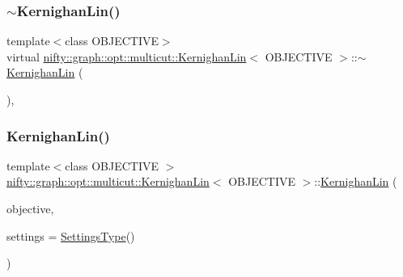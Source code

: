 \subsubsection{\texorpdfstring{$\sim$\+Kernighan\+Lin()}{~KernighanLin()}}
{\footnotesize\ttfamily template$<$class O\+B\+J\+E\+C\+T\+I\+VE$>$ \\
virtual \hyperlink{classnifty_1_1graph_1_1opt_1_1multicut_1_1KernighanLin}{nifty\+::graph\+::opt\+::multicut\+::\+Kernighan\+Lin}$<$ O\+B\+J\+E\+C\+T\+I\+VE $>$\+::$\sim$\hyperlink{classnifty_1_1graph_1_1opt_1_1multicut_1_1KernighanLin}{Kernighan\+Lin} (\begin{DoxyParamCaption}{ }\end{DoxyParamCaption})\hspace{0.3cm}{\ttfamily [inline]}, {\ttfamily [virtual]}}

\mbox{\label{classnifty_1_1graph_1_1opt_1_1multicut_1_1KernighanLin_aef948071eefc0b7dfa13197aa6f92bb9}} 
\subsubsection{\texorpdfstring{Kernighan\+Lin()}{KernighanLin()}}
{\footnotesize\ttfamily template$<$class O\+B\+J\+E\+C\+T\+I\+VE $>$ \\
\hyperlink{classnifty_1_1graph_1_1opt_1_1multicut_1_1KernighanLin}{nifty\+::graph\+::opt\+::multicut\+::\+Kernighan\+Lin}$<$ O\+B\+J\+E\+C\+T\+I\+VE $>$\+::\hyperlink{classnifty_1_1graph_1_1opt_1_1multicut_1_1KernighanLin}{Kernighan\+Lin} (\begin{DoxyParamCaption}\item[{const \hyperlink{classnifty_1_1graph_1_1opt_1_1multicut_1_1KernighanLin_aa5a1c5a577ff9d17db32d5871da3ed45}{Objective\+Type} \&}]{objective,  }\item[{const \hyperlink{structnifty_1_1graph_1_1opt_1_1multicut_1_1KernighanLin_1_1SettingsType}{Settings\+Type} \&}]{settings = {\ttfamily \hyperlink{structnifty_1_1graph_1_1opt_1_1multicut_1_1KernighanLin_1_1SettingsType}{Settings\+Type}()} }\end{DoxyParamCaption})}



